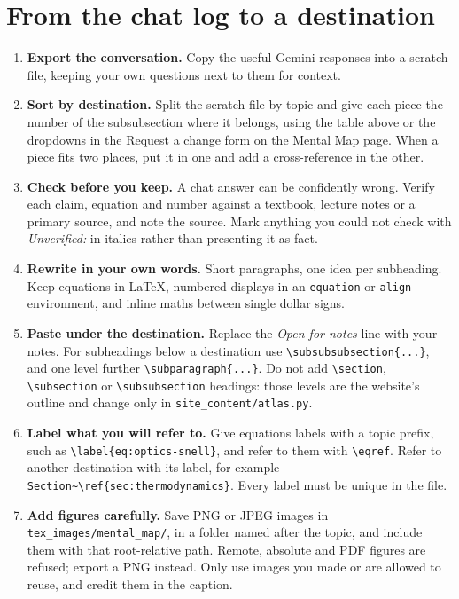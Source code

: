 \documentclass[11pt]{article}
\begin{document}
\section{From the chat log to a destination}
\begin{enumerate}[label=\arabic*.]
\item \textbf{Export the conversation.} Copy the useful Gemini responses into a scratch file, keeping your own questions next to them for context.
\item \textbf{Sort by destination.} Split the scratch file by topic and give each piece the number of the subsubsection where it belongs, using the table above or the dropdowns in the Request a change form on the Mental Map page. When a piece fits two places, put it in one and add a cross-reference in the other.
\item \textbf{Check before you keep.} A chat answer can be confidently wrong. Verify each claim, equation and number against a textbook, lecture notes or a primary source, and note the source. Mark anything you could not check with \textit{Unverified:} in italics rather than presenting it as fact.
\item \textbf{Rewrite in your own words.} Short paragraphs, one idea per subheading. Keep equations in LaTeX, numbered displays in an \texttt{equation} or \texttt{align} environment, and inline maths between single dollar signs.
\item \textbf{Paste under the destination.} Replace the \textit{Open for notes} line with your notes. For subheadings below a destination use \texttt{\textbackslash subsubsubsection\{...\}}, and one level further \texttt{\textbackslash subparagraph\{...\}}. Do not add \texttt{\textbackslash section}, \texttt{\textbackslash subsection} or \texttt{\textbackslash subsubsection} headings: those levels are the website's outline and change only in \texttt{site\_content/atlas.py}.
\item \textbf{Label what you will refer to.} Give equations labels with a topic prefix, such as \texttt{\textbackslash label\{eq:optics-snell\}}, and refer to them with \texttt{\textbackslash eqref}. Refer to another destination with its label, for example \texttt{Section\textasciitilde\textbackslash ref\{sec:thermodynamics\}}. Every label must be unique in the file.
\item \textbf{Add figures carefully.} Save PNG or JPEG images in \texttt{tex\_images/mental\_map/}, in a folder named after the topic, and include them with that root-relative path. Remote, absolute and PDF figures are refused; export a PNG instead. Only use images you made or are allowed to reuse, and credit them in the caption.
\end{enumerate}
\end{document}
